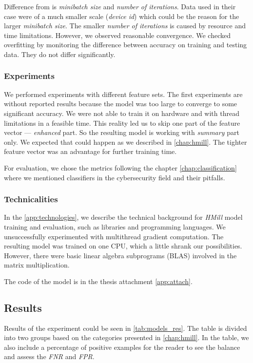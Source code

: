 Difference from \cite{Mandlik2020} is \emph{minibatch size} and \emph{number of iterations}. Data used in their case were of a much smaller scale (\emph{device id}) which could be the reason for the larger \emph{minibatch size}. The smaller \emph{number of iterations} is caused by resource and time limitations. However, we observed reasonable convergence.  We checked overfitting by monitoring the difference between accuracy on training and testing data. They do not differ significantly.

\subsubsection{Experiments}
We performed experiments with different feature sets. The first experiments are without reported results because the model was too large to converge to some significant accuracy. We were not able to train it on hardware and with thread limitations in a feasible time. This reality led us to skip one part of the feature vector --- \emph{enhanced} part. So the resulting model is working with \emph{summary} part only.  We expected that could happen as we described in \ref{chap:hmill}. The tighter feature vector was an advantage for further training time.

For evaluation, we chose the metrics following the chapter \ref{chap:classification} where we mentioned classifiers in the cybersecurity field and their pitfalls.

\subsubsection{Technicalities}
In the \ref{app:technologies}, we describe the technical background for \emph{HMill} model training and evaluation, such as libraries and programming languages. We unsuccessfully experimented with multithread gradient computation. The resulting model was trained on one CPU, which a little shrank our possibilities. However, there were basic linear algebra subprograms (BLAS) involved in the matrix multiplication.

The code of the model is in the thesis attachment \ref{app:attach}.

\subsection{Results}
Results of the experiment could be seen in \ref{tab:models_res}. The table is divided into two groups based on the categories presented in \ref{chap:hmill}. In the table, we also include a percentage of positive examples for the reader to see the balance and assess the \emph{FNR} and \emph{FPR}.

